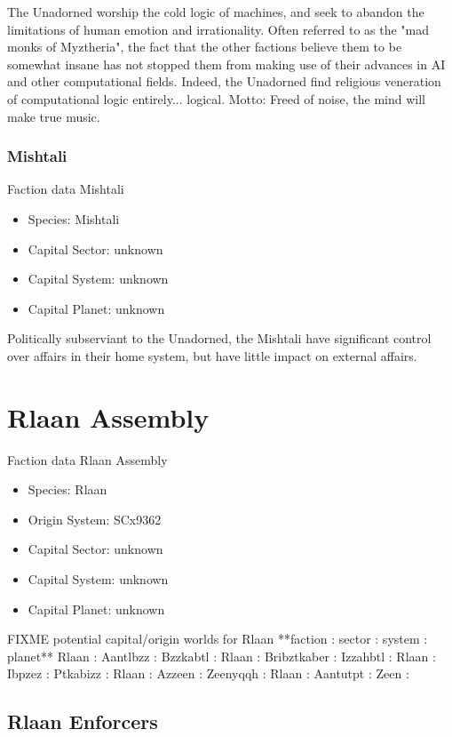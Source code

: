 The Unadorned worship the cold logic of machines, and seek to abandon
the limitations of human emotion and irrationality. Often referred to
as the "mad monks of Myztheria", the fact that the other factions
believe them to be somewhat insane has not stopped them from making
use of their advances in AI and other computational fields. Indeed,
the Unadorned find religious veneration of computational logic
entirely... logical. Motto: Freed of noise, the mind will make true
music.
 
\subsubsection{Mishtali}

Faction data Mishtali
\begin{itemize}
\item Species: Mishtali
\item Capital Sector: unknown
\item Capital System: unknown
\item Capital Planet: unknown
\end{itemize}

Politically subserviant to the Unadorned, the Mishtali have
significant control over affairs in their home system, but have little
impact on external affairs.

\section{Rlaan Assembly}

Faction data Rlaan Assembly
\begin{itemize}
\item Species: Rlaan
\item Origin System: SCx9362
\item Capital Sector: unknown
\item Capital System: unknown
\item Capital Planet: unknown
\end{itemize}

FIXME potential capital/origin worlds for Rlaan
  **faction     : sector      : system      : planet**
    Rlaan       : Aantlbzz    : Bzzkabtl    : 
    Rlaan       : Bribztkaber : Izzahbtl    : 
    Rlaan       : Ibpzez      : Ptkabizz    : 
    Rlaan       : Azzeen      : Zeenyqqh    : 
    Rlaan       : Aantutpt    : Zeen        : 

\subsection{Rlaan Enforcers}


